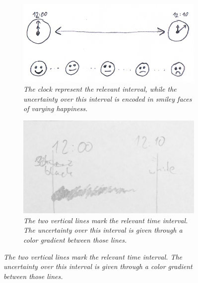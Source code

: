 \begin{itemize}
\begin{itemize}
		\begin{figure}[h]
			\begin{subfigure}[t]{.4\textwidth}
				\centering
				\includegraphics[width=\linewidth]{figures/icons.png}
				\caption{\textit{The clock represent the relevant interval, while the uncertainty over this interval is encoded in smiley faces of varying happiness.}}
				\label{fig:icons}
			\end{subfigure}
			\hfill
			\begin{subfigure}[t]{.4\textwidth}
				\centering
				\includegraphics[width=\linewidth]{figures/color.jpg}
				\caption{\textit{The two vertical lines mark the relevant time interval. The uncertainty over this interval is given through a color gradient between those lines.}}
				\label{fig:color}
			\end{subfigure}
			
			\medskip
			

\end{figure}
\end{itemize}
\end{itemize}
